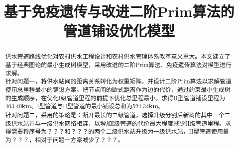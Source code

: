 \documentclass{whutmod}
\title{基于免疫遗传与改进二阶Prim算法的\\管道铺设优化模型}
\begin{document}
	\maketitle
	\thispagestyle{empty}
	\begin{abstract}
		供水管道路线优化对农村供水工程设计和农村供水管理体系改革意义重大。本文建立了基于经典图论的最小生成树模型，采用改进的二阶Prim算法、免疫遗传算法对模型进行求解。
		\\
	
	    针对问题一，将供水站间的距离关系转化为权重矩阵，并设计二阶Prim算法以求解管道使用总里程最小的铺设方案。把节点间的欧式距离作为边的代价，通过约束最小生成树的生成顺序，在优化I级管道里程的前提下优化总里程最小。求得II型管道铺设里程为$\mathbf{403.40}$\textbf{km}、I型管道与II型管道的最小铺设总和为$\mathbf{524.34}$\textbf{km}。
		\\
		
		针对问题二，采用的策略是：断开最长的二级管道，选择升级分割后新树的其中一个二级供水站并与一级供水网络相连，以增加I级管道的代价最大程度减少II级管道里程。求得需要将序号为？？？和？？？的两个二级供水站升级为一级供水站，II型管道使用量为？？？，相对于问题一方案减少了？？？。
		\\
		

\end{abstract}
\end{document}
